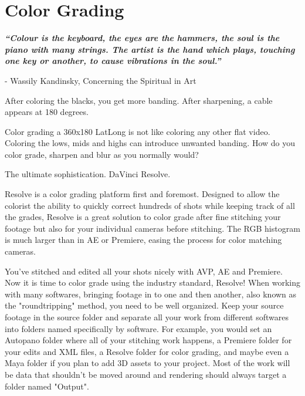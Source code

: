 \chapter{Color Grading}
\pagecolor{white}
\label{chap:54}
\begin{fullwidth}

{\itshape\bfseries “Colour is the keyboard, the eyes are the hammers, the soul is the piano with many strings. The artist is the hand which plays, touching one key or another, to cause vibrations in the soul.”}

- Wassily Kandinsky, Concerning the Spiritual in Art
\vspace{\baselineskip}

\problem

{\large After coloring the blacks, you get more banding. After sharpening, a cable appears at 180 degrees. \par}

Color grading a 360x180 LatLong is not like coloring any other flat video. Coloring the lows, mids and highs can introduce unwanted banding. How do you color grade, sharpen and blur as you normally would? 

\solution

{\large The ultimate sophistication. DaVinci Resolve. \par}

Resolve is a color grading platform first and foremost. Designed to allow the colorist the ability to quickly correct hundreds of shots while keeping track of all the grades, Resolve is a great solution to color grade after fine stitching your footage but also for \textbf{} your individual cameras before stitching. The RGB histogram is much larger than in AE or Premiere, easing the process for color matching cameras.


You've stitched and edited all your shots nicely with AVP, AE and Premiere. Now it is time to color grade using the industry standard, Resolve! When working with many softwares, bringing footage in to one and then another, also known as the "roundtripping" method, you need to be well organized. Keep your source footage in the source folder and separate all your work from different softwares into folders named specifically by software. For example, you would set an Autopano folder where all of your stitching work happens, a Premiere folder for your edits and XML files, a Resolve folder for color grading, and maybe even a Maya folder if you plan to add 3D assets to your project. Most of the work will be data that shouldn't be moved around and rendering should always target a folder named "Output". 


\end{fullwidth}
